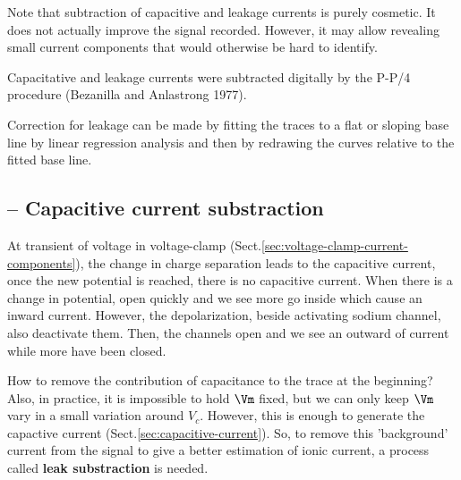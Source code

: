 Note that subtraction of capacitive and leakage currents is purely cosmetic. It
does not actually improve the signal recorded. However, it may allow revealing
small current components that would otherwise be hard to identify.

Capacitative and leakage currents were subtracted digitally by the P-P/4
procedure (Bezanilla and Anlastrong 1977).

Correction for leakage can be made by fitting the traces to a flat or
sloping base line by linear regression analysis and then by redrawing the curves
relative to the fitted base line.

\subsection{-- Capacitive current substraction}
\label{sec:capacitive-current-subtraction}

At transient of voltage in voltage-clamp
(Sect.\ref{sec:voltage-clamp-current-components}), the change in charge
separation leads to the capacitive current, once the new potential is reached,
there is no capacitive current. When there is a change in potential, 
open quickly and we see more  go inside which cause an inward current.
However, the depolarization, beside activating sodium channel, also deactivate
them. Then, the  channels open and we see an outward of  current
while more  have been closed.

How to remove the contribution of capacitance to the trace at the beginning?
Also, in practice, it is impossible to hold $\Vm$ fixed, but we can only keep
$\Vm$ vary in a small variation around $V_c$. However, this is enough to
generate the capactive current (Sect.\ref{sec:capacitive-current}). So, to
remove this 'background' current from the signal to give a better estimation of
ionic current, a process called {\bf leak substraction} is needed.

